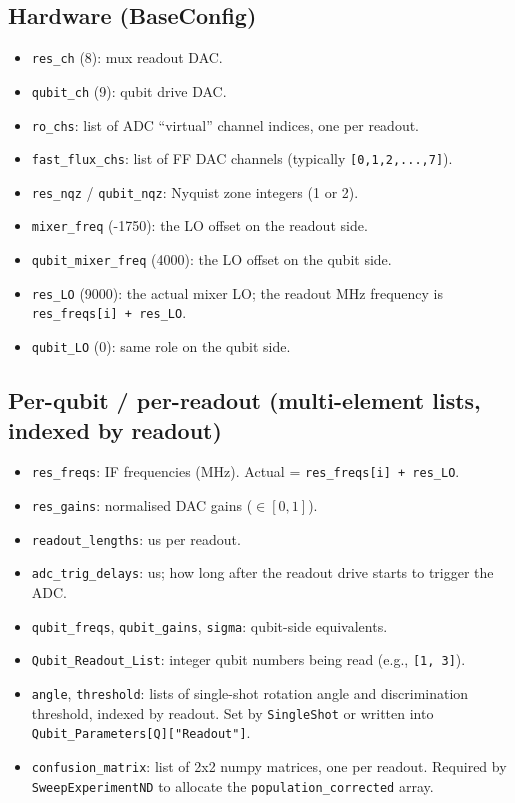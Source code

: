 \documentclass[11pt,letterpaper]{article}
\begin{document}
\subsection{Hardware (BaseConfig)}
\begin{itemize}[leftmargin=*]
  \item \texttt{res\_ch} (8): mux readout DAC.
  \item \texttt{qubit\_ch} (9): qubit drive DAC.
  \item \texttt{ro\_chs}: list of ADC ``virtual'' channel indices, one per readout.
  \item \texttt{fast\_flux\_chs}: list of FF DAC channels (typically \texttt{[0,1,2,...,7]}).
  \item \texttt{res\_nqz} / \texttt{qubit\_nqz}: Nyquist zone integers (1 or 2).
  \item \texttt{mixer\_freq} (-1750): the LO offset on the readout side.
  \item \texttt{qubit\_mixer\_freq} (4000): the LO offset on the qubit side.
  \item \texttt{res\_LO} (9000): the actual mixer LO; the readout MHz frequency is \texttt{res\_freqs[i] + res\_LO}.
  \item \texttt{qubit\_LO} (0): same role on the qubit side.
\end{itemize}

\subsection{Per-qubit / per-readout (multi-element lists, indexed by readout)}
\begin{itemize}[leftmargin=*]
  \item \texttt{res\_freqs}: IF frequencies (MHz). Actual = \texttt{res\_freqs[i] + res\_LO}.
  \item \texttt{res\_gains}: normalised DAC gains (\(\in[0,1]\)).
  \item \texttt{readout\_lengths}: us per readout.
  \item \texttt{adc\_trig\_delays}: us; how long after the readout drive starts to trigger the ADC.
  \item \texttt{qubit\_freqs}, \texttt{qubit\_gains}, \texttt{sigma}: qubit-side equivalents.
  \item \texttt{Qubit\_Readout\_List}: integer qubit numbers being read (e.g., \texttt{[1, 3]}).
  \item \texttt{angle}, \texttt{threshold}: lists of single-shot rotation angle and discrimination threshold, indexed by readout. Set by \texttt{SingleShot} or written into \texttt{Qubit\_Parameters[Q]["Readout"]}.
  \item \texttt{confusion\_matrix}: list of 2x2 numpy matrices, one per readout. Required by \texttt{SweepExperimentND} to allocate the \texttt{population\_corrected} array.
\end{itemize}
\end{document}
